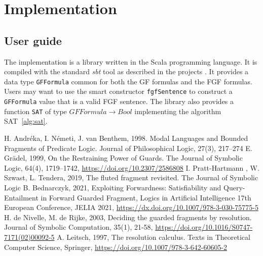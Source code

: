 \documentclass[english, shortabstract]{iithesis}
\theoremstyle{definition} \newtheorem{definition}{Definition}[chapter]
\theoremstyle{remark} \newtheorem{remark}[definition]{Observation}
\theoremstyle{plain} \newtheorem{theorem}[definition]{Theorem}
\theoremstyle{plain} \newtheorem{lemma}[definition]{Lemma}
\begin{document}
\chapter{Implementation}

\section{User guide}

The implementation is a library written in the Scala programming language. It is compiled with the standard \emph{sbt} tool as described in the projects . 
It provides a data type \texttt{GFFormula} common for both the GF formulas and the FGF formulas.
Users may want to use the smart constructor \texttt{fgfSentence} to construct a \texttt{GFFormula} value that is a valid FGF sentence.
The library also provides a function \texttt{SAT} of type $\mathit{GFFormula} \rightarrow \mathit{Bool}$
implementing the algorithm SAT~\ref{alg:sat}.


\begin{thebibliography}{1}
 H. Andréka, I. Németi, J. van Benthem, 1998. Modal Languages and Bounded Fragments of Predicate Logic. Journal of Philosophical Logic, 27(3), 217--274
 E. Grädel, 1999, On the Restraining Power of Guards. The Journal of Symbolic Logic, 64(4), 1719--1742, \url{https://doi.org/10.2307/2586808}
 I. Pratt-Hartmann , W. Szwast, L. Tendera, 2019, The fluted fragment revisited. The Journal of Symbolic Logic
 B. Bednarczyk, 2021, Exploiting Forwardness: Satisfiability and Query-Entailment in Forward Guarded Fragment, Logics in Artificial Intelligence 17th European Conference, JELIA 2021, \url{https://dx.doi.org/10.1007/978-3-030-75775-5}
 H. de Nivelle, M. de Rijke, 2003, Deciding the guarded fragments by resolution. Journal of Symbolic Computation, 35(1), 21-58, \url{https://doi.org/10.1016/S0747-7171(02)00092-5}
 A. Leitsch, 1997, The resolution calculus. Texts in Theoretical Computer Science, Springer, \url{https://doi.org/10.1007/978-3-642-60605-2}

\end{thebibliography}

\end{document}
